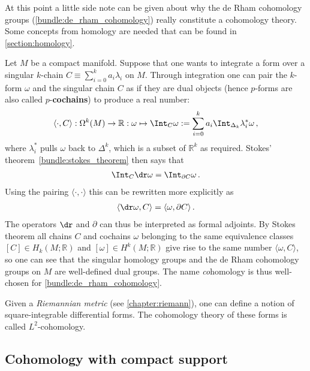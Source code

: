     At this point a little side note can be given about why the de Rham cohomology groups (\cref{bundle:de_rham_cohomology}) really constitute a cohomology theory. Some concepts from homology are needed that can be found in \cref{section:homology}.

    Let $M$ be a compact manifold. Suppose that one wants to integrate a form over a singular $k$-chain $C\equiv\sum_{i=0}^ka_i\lambda_i$ on $M$. Through integration one can pair the $k$-form $\omega$ and the singular chain $C$ as if they are dual objects (hence $p$-forms are also called $p$-\textbf{cochains}) to produce a real number:
    \begin{gather}
        \langle\cdot,C\rangle:\Omega^k(M)\rightarrow\mathbb{R}:\omega\mapsto\Int_C\omega := \sum_{i=0}^ka_i\Int_{\Delta_k}\lambda_i^*\omega\,,
    \end{gather}
    where $\lambda_i^*$ pulls $\omega$ back to $\Delta^k$, which is a subset of $\mathbb{R}^k$ as required. Stokes' theorem~\ref{bundle:stokes_theorem} then says that
    \begin{gather}
        \Int_C\dr\omega = \Int_{\partial C}\omega\,.
    \end{gather}
    Using the pairing $\langle\cdot,\cdot\rangle$ this can be rewritten more explicitly as
    \begin{gather}
        \langle\dr\omega,C \rangle = \langle\omega,\partial C\rangle\,.
    \end{gather}
    The operators $\dr$ and $\partial$ can thus be interpreted as formal adjoints. By Stokes theorem all chains $C$ and cochains $\omega$ belonging to the same equivalence classes $[C]\in H_k(M;\mathbb{R})$ and $[\omega]\in H^k(M;\mathbb{R})$ give rise to the same number $\langle\omega,C\rangle$, so one can see that the singular homology groups and the de Rham cohomology groups on $M$ are well-defined dual groups. The name \textit{co}homology is thus well-chosen for \cref{bundle:de_rham_cohomology}.

    \begin{remark}[$L^2$-cohomology]
        Given a \textit{Riemannian metric} (see \cref{chapter:riemann}), one can define a notion of square-integrable differential forms. The cohomology theory of these forms is called $L^2$-cohomology.
    \end{remark}

\subsection{Cohomology with compact support}\label{section:compact_cohomology}

